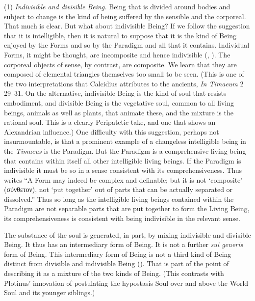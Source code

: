 (1) \emph{Indivisible and divisible Being.} Being that is divided around bodies and subject to change is the kind of being suffered by the sensible and the corporeal. That much is clear. But what about indivisible Being? If we follow the suggestion that it is intelligible, then it is natural to suppose that it is the kind of Being enjoyed by the Forms and so by the Paradigm and all that it contains. Individual Forms, it might be thought, are incomposite and hence indivisible (\citealt[64]{Cornford:1935fk}, \citealt[71]{Robinson:1970lq}). The corporeal objects of sense, by contrast, are composite. We learn that they are composed of elemental triangles themselves too small to be seen. (This is one of the two interpretations that Calcidius attributes to the ancients, \emph{In Timaeum} 2 29--31. On the alternative, indivisible Being is the kind of soul that resists embodiment, and divisible Being is the vegetative soul, common to all living beings, animals as well as plants, that animate these, and the mixture is the rational soul. This is a clearly Peripatetic take, and one that shows an Alexandrian influence.) One difficulty with this suggestion, perhaps not insurmountable, is that a prominent example of a changeless intelligible being in the \emph{Timaeus} is the Paradigm. But the Paradigm is a comprehensive living being that contains within itself all other intelligible living beings. If the Paradigm is indivisible it must be so in a sense consistent with its comprehensiveness. Thus \citet[64]{Cornford:1935fk} writes ``A Form may indeed be complex and definable; but it is not `composite' ({\sbl σύνθετον}), not `put together' out of parts that can be actually separated or dissolved.'' Thus so long as the intelligible living beings contained within the Paradigm are not separable parts that are put together to form the Living Being, its comprehensiveness is consistent with being indivisible in the relevant sense.

The substance of the soul is generated, in part, by mixing indivisible and divisible Being. It thus has an intermediary form of Being. It is not a further \emph{sui generis} form of Being. This intermediary form of Being is not a third kind of Being distinct from divisible and indivisible Being (\citealt[]{Betegh:2019fq}). That is part of the point of describing it as a mixture of the two kinds of Being. (This contrasts with Plotinus' innovation of postulating the hypostasis Soul over and above the World Soul and its younger siblings.)

